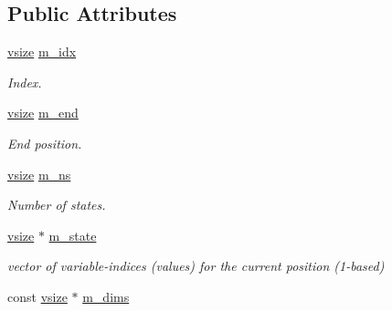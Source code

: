 \subsection*{Public Attributes}
\begin{DoxyCompactItemize}
\item 
\hyperlink{classmerlin_1_1superindex_a4e63d0617c6b351c664cdfd406686d62}{vsize} \hyperlink{classmerlin_1_1superindex_a3d4b9e802f8716e5d18a542302a59bd5}{m\+\_\+idx}\hypertarget{classmerlin_1_1superindex_a3d4b9e802f8716e5d18a542302a59bd5}{}\label{classmerlin_1_1superindex_a3d4b9e802f8716e5d18a542302a59bd5}

\begin{DoxyCompactList}\small\item\em Index. \end{DoxyCompactList}\item 
\hyperlink{classmerlin_1_1superindex_a4e63d0617c6b351c664cdfd406686d62}{vsize} \hyperlink{classmerlin_1_1superindex_acb594096f91008dad86dff53b492420a}{m\+\_\+end}\hypertarget{classmerlin_1_1superindex_acb594096f91008dad86dff53b492420a}{}\label{classmerlin_1_1superindex_acb594096f91008dad86dff53b492420a}

\begin{DoxyCompactList}\small\item\em End position. \end{DoxyCompactList}\item 
\hyperlink{classmerlin_1_1superindex_a4e63d0617c6b351c664cdfd406686d62}{vsize} \hyperlink{classmerlin_1_1superindex_ad9d1dd710851f54d95bf0bab7c509d1a}{m\+\_\+ns}\hypertarget{classmerlin_1_1superindex_ad9d1dd710851f54d95bf0bab7c509d1a}{}\label{classmerlin_1_1superindex_ad9d1dd710851f54d95bf0bab7c509d1a}

\begin{DoxyCompactList}\small\item\em Number of states. \end{DoxyCompactList}\item 
\hyperlink{classmerlin_1_1superindex_a4e63d0617c6b351c664cdfd406686d62}{vsize} $\ast$ \hyperlink{classmerlin_1_1superindex_a4b799ea7b1fe4a42ff9dee3fb8563b01}{m\+\_\+state}\hypertarget{classmerlin_1_1superindex_a4b799ea7b1fe4a42ff9dee3fb8563b01}{}\label{classmerlin_1_1superindex_a4b799ea7b1fe4a42ff9dee3fb8563b01}

\begin{DoxyCompactList}\small\item\em vector of variable-\/indices (values) for the current position (1-\/based) \end{DoxyCompactList}\item 
const \hyperlink{classmerlin_1_1superindex_a4e63d0617c6b351c664cdfd406686d62}{vsize} $\ast$ \hyperlink{classmerlin_1_1superindex_a8e430436cf84a3cb29724ed9f108aab3}{m\+\_\+dims}\hypertarget{classmerlin_1_1superindex_a8e430436cf84a3cb29724ed9f108aab3}{}\label{classmerlin_1_1superindex_a8e430436cf84a3cb29724ed9f108aab3}


\end{DoxyCompactItemize}
